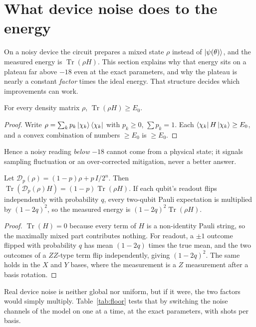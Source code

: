 \section{What device noise does to the energy}
\label{sec:noise}

On a noisy device the circuit prepares a mixed state $\rho$ instead of $\ket{\psi(\theta)}$, and
the measured energy is $\operatorname{Tr}(\rho H)$. This section explains why that energy sits on
a plateau far above $-18$ even at the exact parameters, and why the plateau is nearly a constant
\emph{factor} times the ideal energy. That structure decides which improvements can work.

\begin{prop}\label{prop:mixed}
  For every density matrix $\rho$, $\operatorname{Tr}(\rho H)\ge E_0$.
\end{prop}

\begin{proof}
  Write $\rho=\sum_k p_k\ket{\chi_k}\bra{\chi_k}$ with $p_k\ge0$, $\sum p_k=1$. Each
  $\bra{\chi_k}H\ket{\chi_k}\ge E_0$, and a convex combination of numbers $\ge E_0$ is $\ge E_0$.
\end{proof}

Hence a noisy reading \emph{below} $-18$ cannot come from a physical state; it signals sampling
fluctuation or an over-corrected mitigation, never a better answer.

\begin{prop}\label{prop:depol}
  Let $\mathcal D_p(\rho)=(1-p)\rho+p\,I/2^{n}$. Then $\operatorname{Tr}(\mathcal D_p(\rho)H)=(1-p)\operatorname{Tr}(\rho H)$.
  If each qubit's readout flips independently with probability $q$, every two-qubit Pauli
  expectation is multiplied by $(1-2q)^2$, so the measured energy is $(1-2q)^2\operatorname{Tr}(\rho H)$.
\end{prop}

\begin{proof}
  $\operatorname{Tr}(H)=0$ because every term of $H$ is a non-identity Pauli string, so the
  maximally mixed part contributes nothing. For readout, a $\pm1$ outcome flipped with
  probability $q$ has mean $(1-2q)$ times the true mean, and the two outcomes of a $ZZ$-type term
  flip independently, giving $(1-2q)^2$. The same holds in the $X$ and $Y$ bases, where the
  measurement is a $Z$ measurement after a basis rotation.
\end{proof}

Real device noise is neither global nor uniform, but if it were, the two factors would simply
multiply. Table~\ref{tab:floor} tests that by switching the noise channels of the
 model on one at a time, at the exact parameters, with \VNoiseShots{} shots
per basis.

